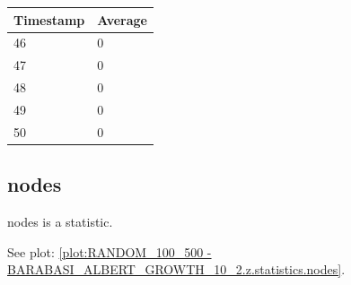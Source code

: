 \begin{tabular}{|l||l|}
\hline
	\textbf{Timestamp} & \textbf{Average} \\ \hline
	46 & 0 \\ \hline
	47 & 0 \\ \hline
	48 & 0 \\ \hline
	49 & 0 \\ \hline
	50 & 0 \\ \hline
\end{tabular}

\subsection{nodes}
nodes is a statistic.

See plot: \ref{plot:RANDOM_100_500 - BARABASI_ALBERT_GROWTH_10_2.z.statistics.nodes}.

